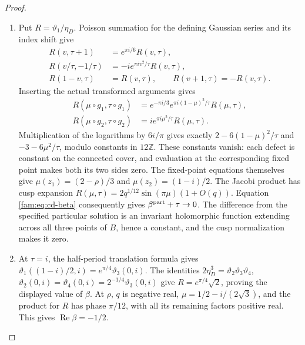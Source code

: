 \begin{proof}
\begin{enumerate}[label=\arabic*.,leftmargin=*]
\item Put \(R=\vartheta_1/\eta_D\). Poisson summation for the defining Gaussian
series and its index shift give
\[
 \begin{aligned}
 R(v,\tau+1)&=e^{\pi i/6}R(v,\tau),\\
 R(v/\tau,-1/\tau)&=-i e^{\pi iv^2/\tau}R(v,\tau),\\
 R(1-v,\tau)&=R(v,\tau),\qquad R(v+1,\tau)=-R(v,\tau).
 \end{aligned}
\]
Inserting the actual transformed arguments gives
\[
 \begin{aligned}
 R(\mu\circ g_1,\tau\circ g_1)
 &=e^{-\pi i/3}e^{\pi i(1-\mu)^2/\tau}R(\mu,\tau),\\
 R(\mu\circ g_2,\tau\circ g_2)
 &=i e^{\pi i\mu^2/\tau}R(\mu,\tau).
 \end{aligned}
\]
Multiplication of the logarithms by \(6i/\pi\) gives exactly
\(2-6(1-\mu)^2/\tau\) and \(-3-6\mu^2/\tau\), modulo constants in
\(12\mathbb Z\). These constants vanish: each defect is constant on the
connected cover, and evaluation at the corresponding fixed point makes
both its two sides zero. The fixed-point equations themselves give
\(\mu(z_1)=(2-\rho)/3\) and \(\mu(z_2)=(1-i)/2\).
The Jacobi product has cusp expansion
\(R(\mu,\tau)=2q^{1/12}\sin(\pi\mu)(1+O(q))\).
Equation \eqref{fam:eq:cd-beta} consequently gives
\(\beta^{\rm part}+\tau\to0\). The difference from the specified particular
solution is an invariant holomorphic function extending across all three
points of \(B\), hence a constant, and the cusp normalization makes it zero.

\item At \(\tau=i\), the half-period translation formula gives
\(\vartheta_1((1-i)/2,i)=e^{\pi/4}\vartheta_3(0,i)\).
The identities \(2\eta_D^3=\vartheta_2\vartheta_3\vartheta_4\),
\(\vartheta_2(0,i)=\vartheta_4(0,i)=2^{-1/4}\vartheta_3(0,i)\)
give \(R=e^{\pi/4}\sqrt2\), proving the displayed value of \(\beta\).
At \(\rho\), \(q\) is negative real, \(\mu=1/2-i/(2\sqrt3)\), and the
product for \(R\) has phase \(\pi/12\), with all its remaining factors
positive real. This gives \(\operatorname{Re}\beta=-1/2\).
\end{enumerate}
\end{proof}

